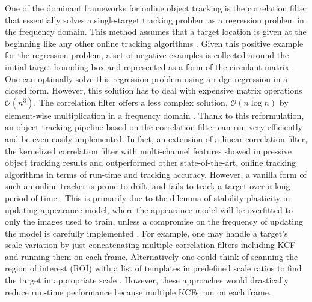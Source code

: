 \documentclass[10pt,twocolumn,letterpaper]{article}
\begin{document}
One of the dominant frameworks for online object tracking is the
correlation filter that essentially solves a single-target tracking
problem as a regression problem in the frequency domain. This method
assumes that a target location is given at the beginning like any
other online tracking algorithms \cite{smeulders2014survey}. Given
this positive example for the regression problem, a set of negative
examples is collected around the initial target bounding box and
represented as a form of the circulant matrix
\cite{henriques2015high}. One can optimally solve this regression
problem using a ridge regression in a closed form. However, this
solution has to deal with expensive matrix operations
$\mathcal{O}(n^{3})$. The correlation filter offers a less complex
solution, $\mathcal{O}(n\log n)$ by element-wise multiplication in a
frequency domain \cite{bolme2010visual,henriques2015high}. Thank to
this reformulation, an object tracking pipeline based on the
correlation filter can run very efficiently and be even easily
implemented. In fact, an extension of a linear correlation filter, the
kernelized correlation filter with multi-channel features
\cite{henriques2015high} showed impressive object tracking results and
outperformed other state-of-the-art, online tracking algorithms in
terms of run-time and tracking accuracy. However, a vanilla form of
such an online tracker is prone to drift, and fails to track a target
over a long period of time \cite{henriques2015high}. This is primarily
due to the dilemma of stability-plasticity in updating appearance
model, where the appearance model will be overfitted to only the
images used to train, unless a compromise on the frequency of updating
the model is carefully implemented \cite{santner2010prost}. For
example, one may handle a target's scale variation by just
concatenating multiple correlation filters including KCF and running
them on each frame. Alternatively one could think of scanning the
region of interest (ROI) with a list of templates in predefined scale
ratios to find the target in appropriate scale
\cite{bibi2015multi,henriques2015high,li2014scale,ma2015long,tang2015multi}. However,
these approaches would drastically reduce run-time performance because
multiple KCFs run on each frame.
\end{document}
